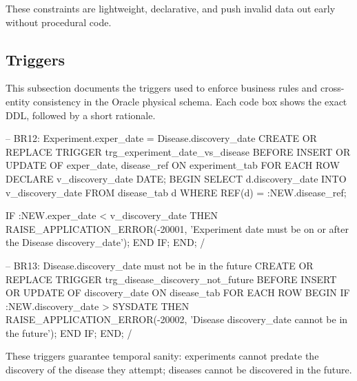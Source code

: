 \documentclass[11pt,a4paper]{article}
\begin{document}
These constraints are lightweight, declarative, and push invalid data out early without procedural code.

\subsection{Triggers}

This subsection documents the triggers used to enforce business rules and cross-entity consistency in the Oracle physical schema. Each code box shows the exact DDL, followed by a short rationale.

\begin{sqlbox}[title={Temporal consistency for diseases and experiments (BR12, BR13)}]
-- BR12: Experiment.exper_date \>= Disease.discovery_date
CREATE OR REPLACE TRIGGER trg_experiment_date_vs_disease
BEFORE INSERT OR UPDATE OF exper_date, disease_ref ON experiment_tab
FOR EACH ROW
DECLARE
  v_discovery_date DATE;
BEGIN
  SELECT d.discovery_date INTO v_discovery_date
  FROM disease_tab d
  WHERE REF(d) = :NEW.disease_ref;

  IF :NEW.exper_date < v_discovery_date THEN
    RAISE_APPLICATION_ERROR(-20001, 'Experiment date must be on or after the Disease discovery_date');
  END IF;
END;
/

-- BR13: Disease.discovery_date must not be in the future
CREATE OR REPLACE TRIGGER trg_disease_discovery_not_future
BEFORE INSERT OR UPDATE OF discovery_date ON disease_tab
FOR EACH ROW
BEGIN
  IF :NEW.discovery_date > SYSDATE THEN
    RAISE_APPLICATION_ERROR(-20002, 'Disease discovery_date cannot be in the future');
  END IF;
END;
/
\end{sqlbox}

These triggers guarantee temporal sanity: experiments cannot predate the discovery of the disease they attempt; diseases cannot be discovered in the future.
\end{document}
